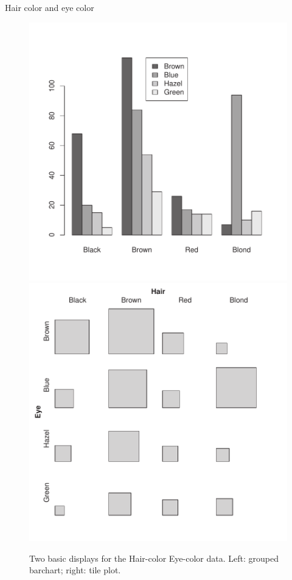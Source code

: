 \documentclass[10pt,krantz2]{krantz}\usepackage[]{graphicx}\usepackage[]{color}
\newenvironment{knitrout}{}{} %
\renewenvironment{knitrout}{\small\renewcommand{\baselinestretch}{.85}}{} %
\begin{document}
\begin{Example}[haireye1]{Hair color and eye color}
\begin{knitrout}
\begin{figure}[!htbp]
\centerline{\includegraphics[width=.49\textwidth]{ch04/fig/bartile-1} 
\includegraphics[width=.49\textwidth]{ch04/fig/bartile-2} }

\caption[Two basic displays for the Hair-color Eye-color data]{Two basic displays for the Hair-color Eye-color data. Left: grouped barchart; right: tile plot.}\label{fig:bartile}
\end{figure}



\end{knitrout}
\end{Example}
\end{document}
